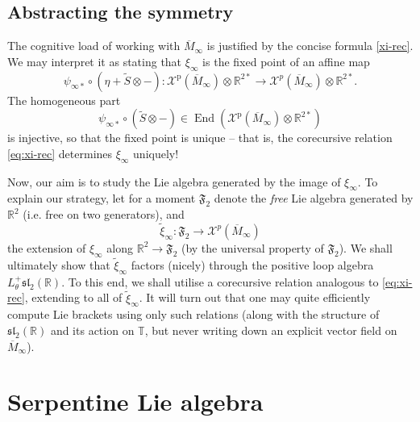 \documentclass{article}
\def\fsl{\mathfrak{sl}}
\def\RR{\mathbb{R}}
\def\TT{\mathbb{T}}
\def\XX{\mathcal{X}}
\def\fF{\mathfrak{F}}
\DeclareMathOperator{\End}{\mathrm{End}}
\def\p{\mathrm{p}}
\theoremstyle{definition}
\begin{document}
\subsection{Abstracting the symmetry}
The cognitive load of working with $\overline M_\infty$
is justified by the concise formula \eqref{xi-rec}.
We may interpret it as stating that $\xi_\infty$ is the fixed point of an affine
map
$$
\psi_{\infty*} \circ \left( \eta + \tilde S \otimes - \right): \XX^\p(\overline M_\infty)\otimes\RR^{2*} \to
\XX^p(\overline M_\infty)\otimes\RR^{2*}. $$
The homogeneous part $$\psi_{\infty*}\circ(\tilde S \otimes -) \in \End(\XX^\p(\overline M_\infty)\otimes\RR^{2*})$$
is injective, so that the fixed point is unique -- that is, the corecursive relation \eqref{eq:xi-rec} determines
$\xi_\infty$ uniquely!

Now, our aim is to study the Lie algebra generated by the image of $\xi_\infty$.
To explain our strategy, let for a moment $\fF_2$ denote the \emph{free} Lie algebra generated by $\RR^2$ (i.e.
free on two generators),
and $$\tilde \xi_\infty:\fF_2 \to \XX^p(\overline M_\infty)$$ the extension 
of $\xi_\infty$ along $\RR^2 \to \fF_2$ (by the universal property of $\fF_2$).
We shall ultimately show that $\tilde\xi_\infty$ factors (nicely) through
the positive loop algebra $L_\theta^+\fsl_2(\RR)$. To this end, we shall utilise
a corecursive relation analogous to \eqref{eq:xi-rec}, extending to all of $\tilde \xi_\infty$.
It will turn out that one may quite efficiently compute Lie brackets using only such 
relations (along with the structure of $\fsl_2(\RR)$ and its action on $\TT$, but
never writing down an explicit vector field on $\overline M_\infty$).

\section{Serpentine Lie algebra}
\label{sec:algebra}
\end{document}
